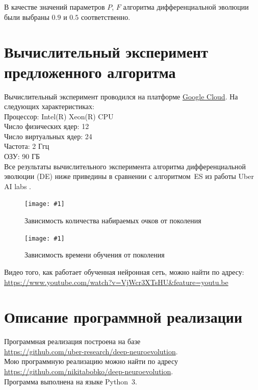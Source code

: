 \documentclass[12pt]{article}
\newcommand{\img}[2]{
    \begin{figure}[H]
        \centering
        \texttt{[image: \#1]}
        \caption{#2}
    \end{figure}
}
\begin{document}
        В качестве значений параметров $P$, $F$ алгоритма дифференциальной эволюции были выбраны $0.9$ и $0.5$ соответственно.

\section{Вычислительный эксперимент предложенного алгоритма}
    Вычислительный эксперимент проводился на платформе \href{https://cloud.google.com/}{Google Cloud}. На следующих характеристиках: \\

    Процессор: Intel(R) Xeon(R) CPU \\
    Число физических ядер: 12 \\
    Число виртуальных ядер: 24 \\
    Частота: 2 Ггц \\
    ОЗУ: 90 ГБ \\

    Все результаты вычислительного эксперимента алгоритма дифференциальной эволюции (DE) ниже приведины в сравнении с алгоритмом~ES из работы Uber AI labs \cite{uber}.
    \img{score_plot.png}{Зависимость количества набираемых очков от поколения}

    \img{time_plot.png}{Зависимость времени обучения от поколения}

    Видео того, как работает обученная нейронная сеть, можно найти по адресу: \\
    \url{https://www.youtube.com/watch?v=VjWcr3XTsHU&feature=youtu.be}

\section{Описание программной реализации}
    Программная реализация построена на базе \\
    \url{https://github.com/uber-research/deep-neuroevolution}. \\
    Мою программную реализацию можно найти по адресу \\
    \url{https://github.com/nikitabobko/deep-neuroevolution}. \\
    Программа выполнена на языке Python~3.\\
\end{document}

